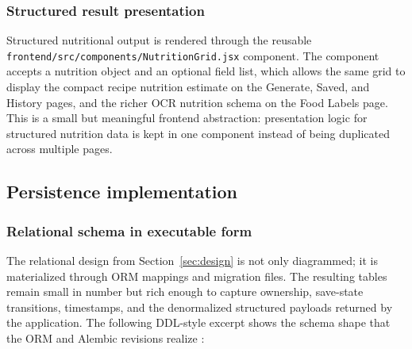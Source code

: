 \subsubsection{Structured result presentation}

Structured nutritional output is rendered through the reusable
\texttt{frontend/src/components/NutritionGrid.jsx} component. The
component accepts a nutrition object and an optional field list, which
allows the same grid to display the compact recipe nutrition estimate on
the Generate, Saved, and History pages, and the richer OCR nutrition
schema on the Food Labels page. This is a small but meaningful frontend
abstraction: presentation logic for structured nutrition data is kept in
one component instead of being duplicated across multiple pages.

\subsection{Persistence implementation}

\subsubsection{Relational schema in executable form}

The relational design from Section~\ref{sec:design} is not only diagrammed; it is
materialized through ORM mappings and migration files. The resulting
tables remain small in number but rich enough to capture ownership,
save-state transitions, timestamps, and the denormalized structured
payloads returned by the application. The following DDL-style excerpt
shows the schema shape that the ORM and Alembic revisions realize
\cite{sqlalchemy2026docs,alembic2026docs}:


